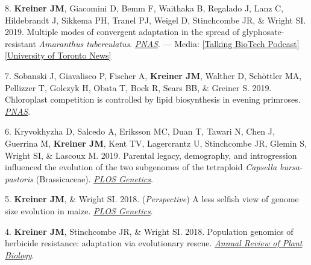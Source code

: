 \documentclass[12pt]{article}
\begin{document}
\noindent\hspace{.1cm}8. \textbf{Kreiner JM}, Giacomini D, Bemm F, Waithaka B, Regalado J, Lanz C, Hildebrandt J, Sikkema PH, Tranel PJ, Weigel D, Stinchcombe JR, \& Wright SI. 2019. Multiple modes of convergent adaptation in the spread of glyphosate-resistant \textit{Amaranthus tuberculatus}. \href{https://www.pnas.org/content/116/42/21076}{\underline{\textit{PNAS}}}.
\hspace{8cm} ---    Media: \href{https://podbay.fm/podcast/1006329802/e/1545471863}{[Talking BioTech Podcast]} \href{https://www.artsci.utoronto.ca/news/u-t-evolutionary-biologists-track-invasion-herbicide-resistant-weeds-south-border}{[University of Toronto News]}

\medskip

\noindent\hspace{.1cm}7. Sobanski J, Giavalisco P, Fischer A,  \textbf{Kreiner JM}, Walther D, Schöttler MA, Pellizzer T, Golczyk H, Obata T, Bock R, Sears BB, \& Greiner S. 2019. Chloroplast competition is controlled by lipid biosynthesis in evening primroses. \href {https://www.pnas.org/content/116/12/5665}{\underline{\textit{PNAS}}}.

\medskip

\noindent\hspace{.1cm}6. Kryvokhyzha D, Salcedo A, Eriksson MC, Duan T, Tawari N, Chen J, Guerrina M, \textbf{Kreiner JM}, Kent TV, Lagercrantz U, Stinchcombe JR, Glemin S, Wright SI, \& Lascoux M. 2019. Parental legacy, demography, and introgression influenced the evolution of the two subgenomes of the tetraploid \textit{Capsella bursa-pastoris} (Brassicaceae). \href {https://journals.plos.org/plosgenetics/article?id=10.1371/journal.pgen.1007949} {\underline{\textit{PLOS Genetics}}}.

\medskip

\noindent\hspace{.1cm}5. \textbf{Kreiner JM}, \& Wright SI. 2018. (\textit{Perspective}) A less selfish view of genome size evolution in maize. \href{https://doi.org/10.1371/journal.pgen.1007249} {\underline{\textit{PLOS Genetics}}}.
\medskip

\noindent\hspace{.1cm}4. \textbf{Kreiner JM}, Stinchcombe JR, \& Wright SI. 2018. Population genomics of herbicide resistance: adaptation via evolutionary rescue. \href{https://doi.org/10.1146/annurev-arplant-042817-040038}{\underline{\textit{Annual Review of Plant Biology}}}.
\end{document}
